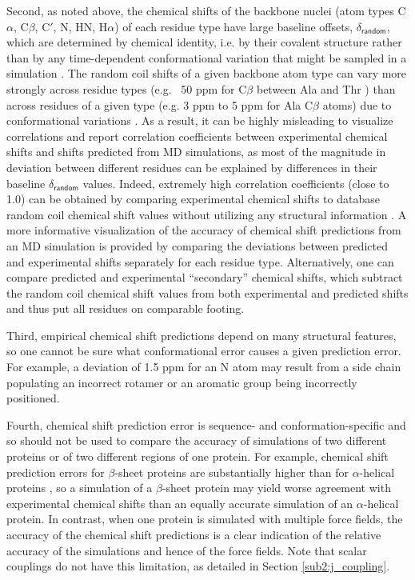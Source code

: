 \documentclass[9pt,review]{livecoms}
\begin{document}
Second, as noted above, the chemical shifts of the backbone nuclei (atom types C$\alpha$, C$\beta$, C$'$, N, HN, H$\alpha$) of each residue type have large baseline offsets, $\delta_{\mathsf{random}}$, which are determined by chemical identity, i.e. by their covalent structure rather than by any time-dependent conformational variation that might be sampled in a simulation \cite{schwarzinger_sequence-dependent_2001,de_simone_accurate_2009,tamiola_sequence-specific_2010,kjaergaard_sequence_2011}.
The random coil shifts of a given backbone atom type can vary more strongly across residue types (e.g. ~50 ppm for C$\beta$ between Ala and Thr \cite{kjaergaard_disordered_2012}) than across residues of a given type (e.g. 3 ppm to 5 ppm for Ala C$\beta$ atoms) due to conformational variations \cite{ulrich_biomagresbank_2008,romero_biomagresbank_2020}.
As a result, it can be highly misleading to visualize correlations and report correlation coefficients between experimental chemical shifts and shifts predicted from MD simulations, as most of the magnitude in deviation between different residues can be explained by differences in their baseline $\delta_{\mathsf{random}}$ values.
Indeed, extremely high correlation coefficients (close to 1.0) can be obtained by comparing experimental chemical shifts to database random coil chemical shift values without utilizing any structural information \cite{de_simone_accurate_2009,kohlhoff_fast_2009,shen_sparta_2010,han_shiftx2_2011}.
A more informative visualization of the accuracy of chemical shift predictions from an MD simulation is provided by comparing the deviations between predicted and experimental shifts separately for each residue type.
Alternatively, one can compare predicted and experimental “secondary” chemical shifts, which subtract the random coil chemical shift values from both experimental and predicted shifts and thus put all residues on comparable footing.

Third, empirical chemical shift predictions depend on many structural features, so one cannot be sure what conformational error causes a given prediction error. For example, a deviation of 1.5 ppm for an N atom may result from a side chain populating an incorrect rotamer or an aromatic group being incorrectly positioned.

Fourth, chemical shift prediction error is sequence- and conformation-specific and so should not be used to compare the accuracy of simulations of two different proteins or of two different regions of one protein.
For example, chemical shift prediction errors for $\beta$-sheet proteins are substantially higher than for $\alpha$-helical proteins \cite{yang_predicting_2021}, so a simulation of a $\beta$-sheet protein may yield worse agreement with experimental chemical shifts than an equally accurate simulation of an $\alpha$-helical protein.
In contrast, when one protein is simulated with multiple force fields, the accuracy of the chemical shift predictions is a clear indication of the relative accuracy of the simulations and hence of the force fields.
Note that scalar couplings do not have this limitation, as detailed in Section \ref{sub2:j_coupling}.
\end{document}
